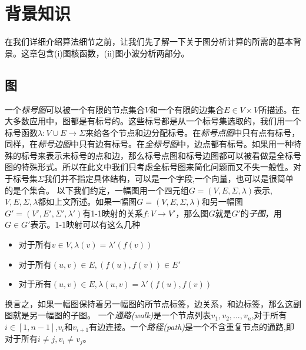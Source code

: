 \documentclass{article}
\begin{document}
\else
\fi
\section{背景知识}
在我们详细介绍算法细节之前，让我们先了解一下关于图分析计算的所需的基本背景。这章包含(i)图核函数，(ii)图小波分析两部分。
\subsection{图}
一个\emph{标号图}可以被一个有限的节点集合$V$和一个有限的边集合$E\in V\times V$所描述。在大多数应用中，图都是有标号的。这些标号都是从一个标号集选取的，我们用一个标号函数$\lambda :V\cup E\rightarrow \Sigma$来给各个节点和边分配标号。在\emph{标号点图}中只有点有标号，同样，在\emph{标号边图}中只有边有标号。在\emph{全标号图}中，边点都有标号。如果用一种特殊的标号来表示未标号的点和边，那么标号点图和标号边图都可以被看做是全标号图的特殊形式。所以在此文中我们只考虑全标号图来简化问题而又不失一般性。对于标号集$\Sigma$我们并不指定具体结构，可以是一个字段,一个向量，也可以是很简单的是个集合。
以下我们约定，一幅图用一个四元组$G=(V,E,\Sigma ,\lambda )$表示,$V,E,\Sigma,\lambda$都如上文所述。如果一幅图$G=(V,E,\Sigma,\lambda)$和另一幅图$G'=(V',E',\Sigma',\lambda')$有1-1映射的关系$f:V\rightarrow V'$，那么图$G$就是$G'$的\emph{子图}，用$G\in G' $表示。1-1映射可以有这么几种
\begin{itemize}
    \item 对于所有$v\in V,\lambda(v)=\lambda '(f(v))$
    \item 对于所有$(u,v)\in E,(f(u),f(v))\in E'$
    \item 对于所有$(u,v)\in E,\lambda(u,v)=\lambda '(f(u),f(v)) $
\end{itemize}
换言之，如果一幅图保持着另一幅图的所节点标签，边关系，和边标签，那么这副图就是另一幅图的子图。
一个\emph{通路(walk)}是一个节点列表$v_1,v_2,...,v_n$,对于所有$i\in [1,n-1]$,$v_i$和$v_{i+1}$有边连接。一个\emph{路径(path)}是一个不含重复节点的通路,即对于所有$i\neq j,v_i \neq v_j$。
\end{document}

